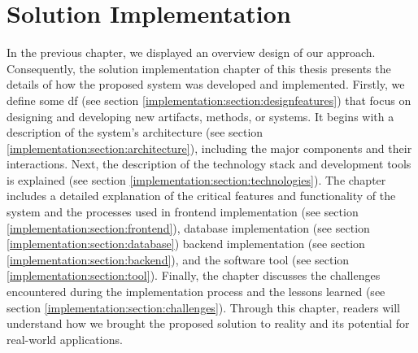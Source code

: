 
\chapter{Solution Implementation}

\ifpdf
    \graphicspath{{Chapters/Implementation/Figs/}{Chapters/Implementation/Figs/}{Chapters/Implementation/Figs/}}
\else
    \graphicspath{{Chapters/Implementation/Figs/}{Chapters/Implementation/Figs/}}
\fi
In the previous chapter, we displayed an overview design of our approach.
Consequently, the solution implementation chapter of this thesis presents the details of how the proposed system was developed and implemented.
Firstly, we define some \ac{df} (see section \ref{implementation:section:designfeatures}) that focus on designing and developing new artifacts, methods, or systems.
It begins with a description of the system's architecture (see section \ref{implementation:section:architecture}), including the major components and their interactions.
Next, the description of the technology stack and development tools is explained (see section \ref{implementation:section:technologies}).
The chapter includes a detailed explanation of the critical features and functionality of the system and the processes used in frontend implementation (see section \ref{implementation:section:frontend}), database implementation (see section \ref{implementation:section:database}) backend implementation (see section \ref{implementation:section:backend}), and the software tool (see section \ref{implementation:section:tool}). 
Finally, the chapter discusses the challenges encountered during the implementation process and the lessons learned (see section \ref{implementation:section:challenges}). 
Through this chapter, readers will understand how we brought the proposed solution to reality and its potential for real-world applications.

